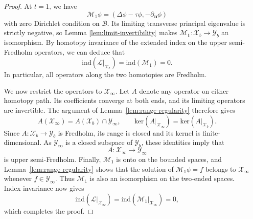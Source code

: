 \documentclass[12pt,letterpaper]{amsart}
\numberwithin{equation}{section}
\begin{document}
\begin{proof}
	At $t=1$, we have
	\begin{equation*}
		\mathcal{M}_1\phi=(\Delta\phi-\tau\phi,-\partial_\mathbf{n}\phi)
	\end{equation*}
	with zero Dirichlet condition on $\mathcal{B}$.  Its limiting transverse principal eigenvalue is strictly negative, so Lemma    \ref{lem:limit-invertibility}      makes $\mathcal{M}_1:\mathscr{X}_b\to\mathscr{Y}_b$
	 an isomorphism. By homotopy invariance of the extended index on the upper semi-Fredholm operators, we can deduce that
	\begin{equation*}
		\mathrm{ind}(\mathscr{L}|_{\mathscr{X}_b})=\mathrm{ind} (\mathcal{M}_1)=0.
	\end{equation*}
	In particular, {all operators along the two homotopies are Fredholm.}
	
	{We now restrict the operators to $\mathscr X_\infty$. Let $A$ denote any operator on either homotopy path. Its coefficients converge at both ends, and its limiting operators are invertible. The argument of Lemma~\ref{lem:range-regularity} therefore gives}
	\begin{equation*}
		A(\mathscr{X}_\infty)=A(\mathscr{X}_b)\cap\mathscr{Y}_\infty,\qquad\mathrm{ker}(A|_{\mathscr{X}_\infty})=\mathrm{ker}(A|_{\mathscr{X}_b}).
	\end{equation*}
	{Since $A:\mathscr X_b\to\mathscr Y_b$ is Fredholm, its range is closed and its kernel is finite-dimensional. As $\mathscr Y_\infty$ is a closed subspace of $\mathscr Y_b$, these identities imply that}
	\begin{equation*}
		A:\mathscr{X}_\infty\to\mathscr{Y}_\infty
	\end{equation*}
	{is upper semi-Fredholm. Finally, $\mathcal M_1$ is onto on the bounded spaces, and Lemma~\ref{lem:range-regularity} shows that the solution of $\mathcal M_1\phi=f$ belongs to $\mathscr X_\infty$ whenever $f\in\mathscr Y_\infty$. Thus $\mathcal M_1$ is also an isomorphism on the two-ended spaces. Index invariance now gives}
	\begin{equation*}
		\mathrm{ind}(\mathscr{L}|_{\mathscr{X}_\infty})=\mathrm{ind}(\mathcal{M}_1|_{\mathscr{X}_\infty})=0,
	\end{equation*}
	which completes the proof.
	\end{proof}
	
	
\end{document}

